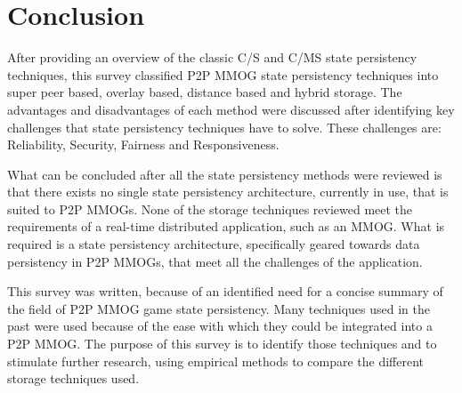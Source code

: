 \documentclass[10pt,a4paper,journal,cspaper,compsoc]{IEEEtran}
\begin{document}
\section{Conclusion}


After providing an overview of the classic C/S and C/MS state persistency techniques, this survey classified P2P MMOG state persistency techniques
into super peer based, overlay based, distance based and hybrid storage. The advantages and disadvantages of each method were discussed after
identifying key challenges that state persistency techniques have to solve. These challenges are: Reliability, Security, Fairness and Responsiveness.

What can be concluded after all the state persistency methods were reviewed is that there exists no single state persistency architecture, currently
in use, that is suited to P2P MMOGs. None of the storage techniques reviewed meet the requirements of a real-time distributed application, such as an
MMOG. What is required is a state persistency architecture, specifically geared towards data persistency in P2P MMOGs, that meet all the challenges
of the application.

This survey was written, because of an identified need for a concise summary of the field of P2P MMOG game state persistency. Many techniques used in
the past were used because of the ease with which they could be integrated into a P2P MMOG. The purpose of this survey is to identify those
techniques and to stimulate further research, using empirical methods to compare the different storage techniques used.




\end{document}

